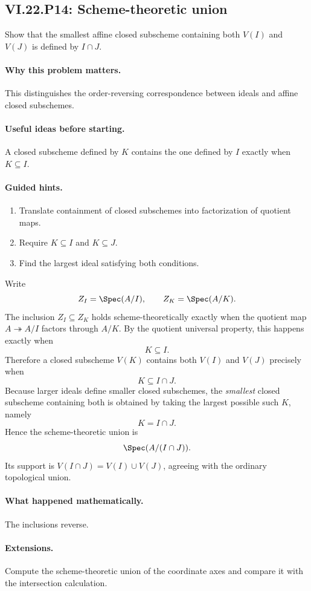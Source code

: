 \subsection*{VI.22.P14: Scheme-theoretic union}
\begin{problem}\label{prob:vi22-p14}
Show that the smallest affine closed subscheme containing both $V(I)$ and $V(J)$ is defined by $I\cap J$.
\end{problem}

\ifdefined\FullProblemDossiers
\paragraph{Why this problem matters.}
This distinguishes the order-reversing correspondence between ideals and affine closed subschemes.

\paragraph{Useful ideas before starting.}
A closed subscheme defined by $K$ contains the one defined by $I$ exactly when $K\subseteq I$.

\paragraph{Guided hints.}
\begin{enumerate}
\item Translate containment of closed subschemes into factorization of quotient maps.
\item Require $K\subseteq I$ and $K\subseteq J$.
\item Find the largest ideal satisfying both conditions.
\end{enumerate}

\begin{solution}
Write
\[
 Z_I=\Spec(A/I),\qquad Z_K=\Spec(A/K).
\]
The inclusion $Z_I\subseteq Z_K$ holds scheme-theoretically exactly when the quotient map
$A\twoheadrightarrow A/I$ factors through $A/K$.  By the quotient universal property, this
happens exactly when
\[
 K\subseteq I.
\]
Therefore a closed subscheme $V(K)$ contains both $V(I)$ and $V(J)$ precisely when
\[
 K\subseteq I\cap J.
\]
Because larger ideals define smaller closed subschemes, the \emph{smallest} closed subscheme
containing both is obtained by taking the largest possible such $K$, namely
\[
 K=I\cap J.
\]
Hence the scheme-theoretic union is
\[
 \Spec(A/(I\cap J)).
\]
Its support is $V(I\cap J)=V(I)\cup V(J)$, agreeing with the ordinary topological union.
\end{solution}

\paragraph{What happened mathematically.}
The inclusions reverse.

\paragraph{Extensions.}
Compute the scheme-theoretic union of the coordinate axes and compare it with the intersection calculation.
\fi

